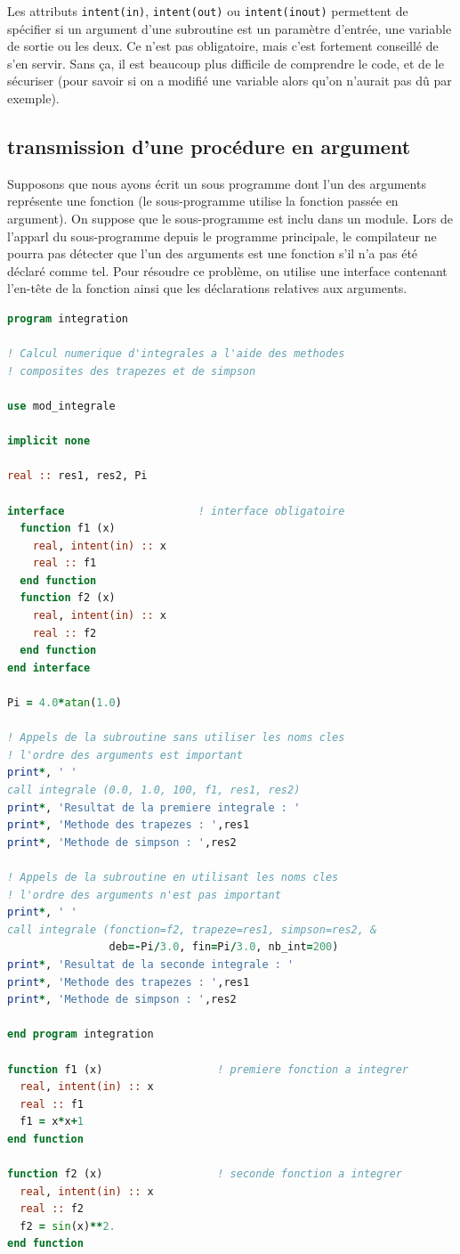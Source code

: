\documentclass[a4paper,twoside]{article}
\begin{document}
Les attributs \texttt{intent(in)}, \texttt{intent(out)} ou \texttt{intent(inout)} permettent de spécifier si un argument d'une subroutine est un paramètre d'entrée, une variable de sortie ou les deux. Ce n'est pas obligatoire, mais c'est fortement conseillé de s'en servir. Sans ça, il est beaucoup plus difficile de comprendre le code, et de le sécuriser (pour savoir si on a modifié une variable alors qu'on n'aurait pas dû par exemple).

\subsection{transmission d'une procédure en argument}
Supposons que nous ayons écrit un sous programme dont l'un des arguments représente une fonction (le sous-programme utilise la fonction passée en argument). On suppose que le sous-programme est inclu dans un module. Lors de l'apparl du sous-programme depuis le programme principale, le compilateur ne pourra pas détecter que l'un des arguments est une fonction s'il n'a pas été déclaré comme tel. Pour résoudre ce problème, on utilise une interface contenant l'en-tête de la fonction ainsi que les déclarations relatives aux arguments. 
\begin{lstlisting}[language=Fortran]
program integration

! Calcul numerique d'integrales a l'aide des methodes
! composites des trapezes et de simpson

use mod_integrale

implicit none

real :: res1, res2, Pi

interface                     ! interface obligatoire
  function f1 (x)
    real, intent(in) :: x
    real :: f1
  end function
  function f2 (x)
    real, intent(in) :: x
    real :: f2
  end function
end interface

Pi = 4.0*atan(1.0)

! Appels de la subroutine sans utiliser les noms cles
! l'ordre des arguments est important
print*, ' '
call integrale (0.0, 1.0, 100, f1, res1, res2)
print*, 'Resultat de la premiere integrale : '
print*, 'Methode des trapezes : ',res1
print*, 'Methode de simpson : ',res2

! Appels de la subroutine en utilisant les noms cles
! l'ordre des arguments n'est pas important
print*, ' '
call integrale (fonction=f2, trapeze=res1, simpson=res2, &
                deb=-Pi/3.0, fin=Pi/3.0, nb_int=200)
print*, 'Resultat de la seconde integrale : '
print*, 'Methode des trapezes : ',res1
print*, 'Methode de simpson : ',res2

end program integration

function f1 (x)                  ! premiere fonction a integrer
  real, intent(in) :: x
  real :: f1
  f1 = x*x+1
end function

function f2 (x)                  ! seconde fonction a integrer
  real, intent(in) :: x
  real :: f2
  f2 = sin(x)**2.
end function
\end{lstlisting}
\end{document}
